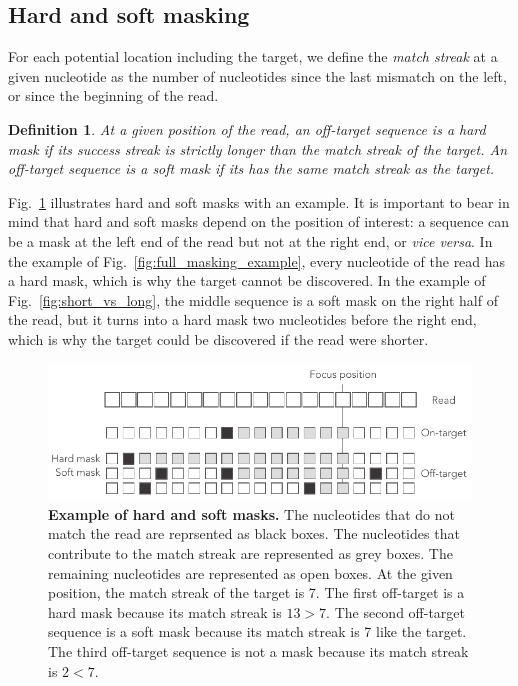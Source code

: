 \documentclass{article}
\newtheorem{definition}{Definition}
\begin{document}
\subsection{Hard and soft masking}

For each potential location including the target, we define the
\emph{match streak} at a given nucleotide as the number of nucleotides
since the last mismatch on the left, or since the beginning of the read.

\begin{definition}
At a given position of the read, an off-target sequence is a \emph{hard
mask} if its success streak is strictly longer than the match streak of
the target. An off-target sequence is a \emph{soft mask} if its has the
same match streak as the target.
\end{definition}

Fig.~\ref{fig:hard_vs_soft_masks} illustrates hard and soft masks with an
example. It is important to bear in mind that hard and soft masks depend
on the position of interest: a sequence can be a mask at the left end of
the read but not at the right end, or \textit{vice versa}. In the example
of Fig.~\ref{fig:full_masking_example}, every nucleotide of the read has a
hard mask, which is why the target cannot be discovered. In the example of
Fig.~\ref{fig:short_vs_long}, the middle sequence is a soft mask on the
right half of the read, but it turns into a hard mask two nucleotides
before the right end, which is why the target could be discovered if the
read were shorter.

\begin{figure}[h]
\centering
\includegraphics[scale=0.85]{hard_vs_soft_masks.pdf}
\caption{\textbf{Example of hard and soft masks.}
The nucleotides that do not match the read are reprsented as black boxes.
The nucleotides that contribute to the match streak are represented as
grey boxes. The remaining nucleotides are represented as open boxes. At
the given position, the match streak of the target is 7. The first
off-target is a hard mask because its match streak is $13>7$. The second
off-target sequence is a soft mask because its match streak is 7 like the
target. The third off-target sequence is not a mask because its match
streak is $2<7$.}
\label{fig:hard_vs_soft_masks}
\end{figure}
\end{document}
